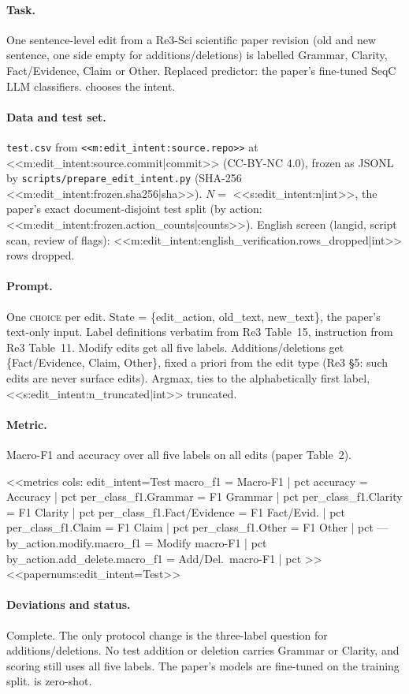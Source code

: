 \paragraph{Task.} One sentence-level edit from a Re3-Sci scientific paper revision (old and new sentence, one side
empty for additions/deletions) is labelled Grammar, Clarity, Fact/Evidence, Claim or Other. Replaced predictor: the
paper's fine-tuned SeqC LLM classifiers. \jev{} chooses the intent.

\paragraph{Data and test set.} \texttt{test.csv} from \texttt{<<m:edit_intent:source.repo>>} at
<<m:edit_intent:source.commit|commit>> (CC-BY-NC 4.0), frozen as JSONL by \texttt{scripts/\allowbreak{}prepare\_edit\_intent.py} (SHA-256
<<m:edit_intent:frozen.sha256|sha>>). $N=$ <<s:edit_intent:n|int>>, the paper's exact document-disjoint test split
(by action: <<m:edit_intent:frozen.action_counts|counts>>). English screen (langid, script scan, review of
flags): <<m:edit_intent:english_verification.rows_dropped|int>> rows dropped.

\paragraph{Prompt.} One \textsc{choice} per edit. State = \{edit\_action, old\_text, new\_text\}, the paper's
text-only input. Label definitions verbatim from Re3 Table~15, instruction from Re3 Table~11. Modify edits get all
five labels. Additions/deletions get \{Fact/Evidence, Claim, Other\}, fixed a priori from the edit type (Re3 \S5:
such edits are never surface edits). Argmax, ties to the alphabetically first label, <<s:edit_intent:n_truncated|int>>
truncated.

\paragraph{Metric.} Macro-F1 and accuracy over all five labels on all edits (paper Table~2).

<<metrics
cols: edit_intent=Test
macro_f1 = Macro-F1 | pct
accuracy = Accuracy | pct
per_class_f1.Grammar = F1 Grammar | pct
per_class_f1.Clarity = F1 Clarity | pct
per_class_f1.Fact/Evidence = F1 Fact/Evid. | pct
per_class_f1.Claim = F1 Claim | pct
per_class_f1.Other = F1 Other | pct
---
by_action.modify.macro_f1 = Modify macro-F1 | pct
by_action.add_delete.macro_f1 = Add/Del.\ macro-F1 | pct
>>
<<papernums:edit_intent=Test>>

\paragraph{Deviations and status.} Complete. The only protocol change is the three-label question for
additions/deletions. No test addition or deletion carries Grammar or Clarity, and scoring still uses all five labels.
The paper's models are fine-tuned on the training split. \jev{} is zero-shot.

